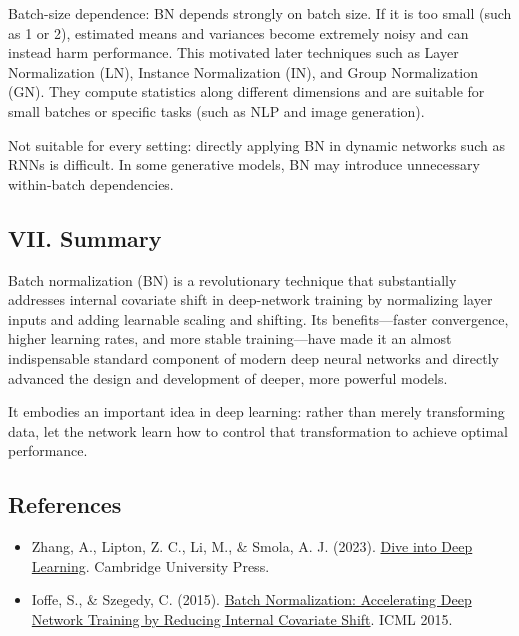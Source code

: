 Batch-size dependence: BN depends strongly on batch size. If it is too small (such as 1 or 2), estimated means and variances become extremely noisy and can instead harm performance. This motivated later techniques such as Layer Normalization (LN), Instance Normalization (IN), and Group Normalization (GN). They compute statistics along different dimensions and are suitable for small batches or specific tasks (such as NLP and image generation).

Not suitable for every setting: directly applying BN in dynamic networks such as RNNs is difficult. In some generative models, BN may introduce unnecessary within-batch dependencies.

\hypertarget{vii.-summary}{%
\subsection{VII. Summary}\label{vii.-summary}}

Batch normalization (BN) is a revolutionary technique that substantially addresses internal covariate shift in deep-network training by normalizing layer inputs and adding learnable scaling and shifting. Its benefits---faster convergence, higher learning rates, and more stable training---have made it an almost indispensable standard component of modern deep neural networks and directly advanced the design and development of deeper, more powerful models.

It embodies an important idea in deep learning: rather than merely transforming data, let the network learn how to control that transformation to achieve optimal performance.

\FloatBarrier
{}
\hypertarget{references-8}{%
\subsection{References}\label{references-8}}

\vspace{0.25em}
\begin{itemize}
\tightlist
\item
  Zhang, A., Lipton, Z. C., Li, M., \& Smola, A. J. (2023). \href{https://D2L.ai}{Dive into Deep Learning}. Cambridge University Press.
\item
  Ioffe, S., \& Szegedy, C. (2015). \href{https://arxiv.org/abs/1502.03167}{Batch Normalization: Accelerating Deep Network Training by Reducing Internal Covariate Shift}. ICML 2015.
\end{itemize}

\clearpage
